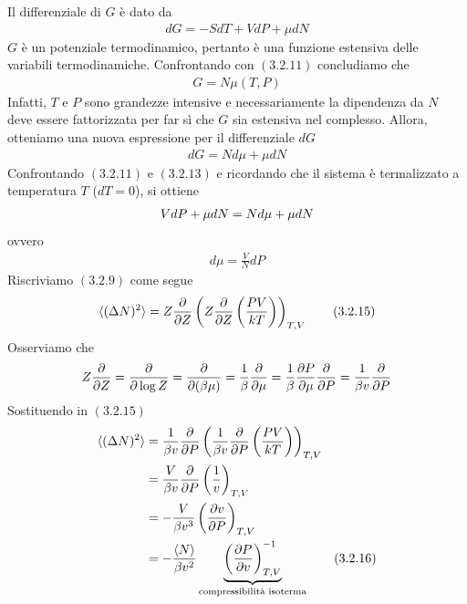 \documentclass{article}
\begin{document}
Il differenziale di $G$ è dato da
\begin{align}
    dG = -SdT + VdP + \mu dN \tag{3.2.11}
\end{align}
$G$ è un potenziale termodinamico, pertanto è una funzione estensiva delle variabili termodinamiche. Confrontando con $(3.2.11)$ concludiamo che 
\begin{align}
    G = N\mu(T, P) \tag{3.2.12}
\end{align}
Infatti, $T$ e $P$ sono grandezze intensive e necessariamente la dipendenza da $N$ deve essere fattorizzata per far sì che $G$ sia estensiva nel complesso. Allora, otteniamo una nuova espressione per il differenziale $dG$
\begin{align}
    dG = Nd\mu + \mu dN \tag{3.2.13}
\end{align}
Confrontando $(3.2.11)$ e $(3.2.13)$ e ricordando che il sistema è termalizzato a temperatura $T$ ($dT = 0$), si ottiene
\begin{align}
    VdP + \mu dN = Nd\mu + \mu dN \notag
\end{align}
ovvero
\begin{align}
    d\mu = \frac{V}{N}dP \tag{3.2.14}
\end{align}
Riscriviamo $(3.2.9)$ come segue
\begin{align}
    \braket{(\Delta N)^2} = Z\frac{\partial}{\partial Z}\left(Z\frac{\partial}{\partial Z}\left(\frac{PV}{kT}\right)\right)_{T, V} \tag{3.2.15}
\end{align}
Osserviamo che 
\begin{align}
    Z\frac{\partial}{\partial Z} = \frac{\partial}{\partial \log Z} = \frac{\partial}{\partial(\beta\mu)} = \frac{1}{\beta}\frac{\partial}{\partial\mu} = \frac{1}{\beta}\frac{\partial P}{\partial \mu}\frac{\partial}{\partial P} = \frac{1}{\beta v}\frac{\partial}{\partial P} \notag
\end{align}
Sostituendo in $(3.2.15)$
\begin{align}
    \braket{(\Delta N)^2} &= \frac{1}{\beta v}\frac{\partial}{\partial P}\left(\frac{1}{\beta v}\frac{\partial}{\partial P}\left(\frac{PV}{kT}\right)\right)_{T, V} \notag \\
    &= \frac{V}{\beta v}\frac{\partial}{\partial P}\left(\frac{1}{v}\right)_{T, V} \notag \\
    &= -\frac{V}{\beta v^3}\left(\frac{\partial v}{\partial P}\right)_{T, V} \notag \\
    &= -\frac{\braket{N}}{\beta v^2}\underbrace{\left(\frac{\partial P}{\partial v}\right)^{-1}_{T, V}}_{\text{compressibilità isoterma}} \tag{3.2.16}
\end{align}
\end{document}

